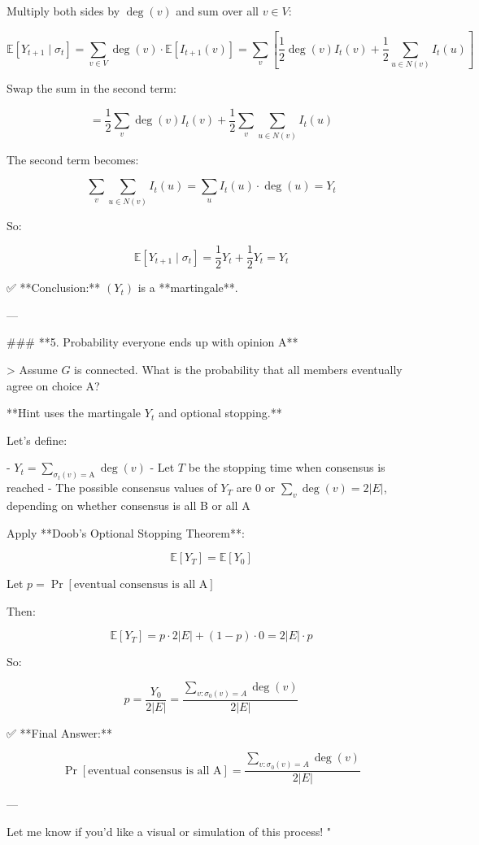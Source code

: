 \begin{enumerate}
\begin{shaded}
\begin{enumerate}
Multiply both sides by \( \deg(v) \) and sum over all \( v \in V \):

\[
\mathbb{E}[Y_{t+1} \mid \sigma_t] = \sum_{v \in V} \deg(v) \cdot \mathbb{E}[I_{t+1}(v)]
= \sum_{v} \left[ \frac{1}{2} \deg(v) I_t(v) + \frac{1}{2} \sum_{u \in N(v)} I_t(u) \right]
\]

Swap the sum in the second term:

\[
= \frac{1}{2} \sum_{v} \deg(v) I_t(v) + \frac{1}{2} \sum_{v} \sum_{u \in N(v)} I_t(u)
\]

The second term becomes:

\[
\sum_{v} \sum_{u \in N(v)} I_t(u) = \sum_{u} I_t(u) \cdot \deg(u) = Y_t
\]

So:

\[
\mathbb{E}[Y_{t+1} \mid \sigma_t] = \frac{1}{2} Y_t + \frac{1}{2} Y_t = Y_t
\]

✅ **Conclusion:** \( (Y_t) \) is a **martingale**.

---

### **5. Probability everyone ends up with opinion A**

> Assume \( G \) is connected. What is the probability that all members eventually agree on choice A?

**Hint uses the martingale \( Y_t \) and optional stopping.**

Let's define:

- \( Y_t = \sum_{\sigma_t(v) = \text{A}} \deg(v) \)
- Let \( T \) be the stopping time when consensus is reached
- The possible consensus values of \( Y_T \) are \( 0 \) or \( \sum_v \deg(v) = 2|E| \), depending on whether consensus is all B or all A

Apply **Doob's Optional Stopping Theorem**:

\[
\mathbb{E}[Y_T] = \mathbb{E}[Y_0]
\]

Let \( p = \Pr[\text{eventual consensus is all A}] \)

Then:

\[
\mathbb{E}[Y_T] = p \cdot 2|E| + (1 - p) \cdot 0 = 2|E| \cdot p
\]

So:

\[
p = \frac{Y_0}{2|E|}
= \frac{\sum_{v : \sigma_0(v) = A} \deg(v)}{2|E|}
\]

✅ **Final Answer:**

\[
\boxed{
\Pr[\text{eventual consensus is all A}] = \frac{\sum_{v : \sigma_0(v) = A} \deg(v)}{2|E|}
}
\]

--- 

Let me know if you'd like a visual or simulation of this process!
"


\end{enumerate}
\end{shaded}
\end{enumerate}
